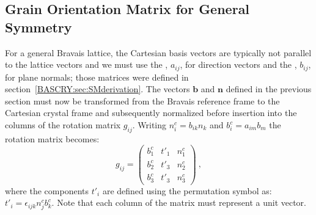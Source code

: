\subsection{Grain Orientation Matrix for General Symmetry}\label{\chabbr:ssec:grainORmatgeneral}
For a general Bravais lattice, the Cartesian basis vectors are typically not parallel to the lattice vectors and we must use the , $a_{ij}$, for direction vectors and the , $b_{ij}$, for plane normals; those matrices were defined in section~\ref{BASCRY:sec:SMderivation}.  The vectors $\mathbf{b}$ and $\mathbf{n}$ defined in the previous section must now be transformed from the Bravais reference frame to the Cartesian crystal frame and subsequently normalized before insertion into the columns of the rotation matrix $g_{ij}$.  Writing $n^c_i=b_{ik}n_k$ and $b^c_i=a_{im}b_m$ the rotation matrix becomes:
\[
	g_{ij} = \begin{pmatrix}
	b^c_1 & t'_1 & n^c_1\\
	b^c_2 & t'_3 & n^c_2\\
	b^c_3 & t'_3 & n^c_3
	\end{pmatrix}\ ,
\]
where the components $t'_i$ are defined using the permutation symbol as: $t'_i=\epsilon_{ijk}n^c_j b^c_k$. Note that each column of the matrix must represent a unit vector.

